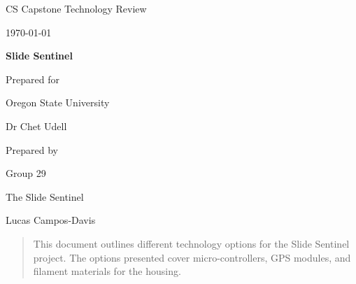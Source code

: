 \documentclass[onecolumn, draftclsnofoot,10pt, compsoc]{IEEEtran}
\def \CapstoneTeamName{		        The Slide Sentinel}
\def \CapstoneTeamNumber{		    29}
\def \GroupMemberTwo{			    Lucas Campos-Davis}
\def \CapstoneProjectName{		    Slide Sentinel}
\def \CapstoneSponsorCompany{	    Oregon State University}
\def \CapstoneSponsorPerson{		Dr Chet Udell}
\def \DocType{	%
				Technology Review
				}
\newcommand{\NameSigPair}[1]{\par
\makebox[2.75in][r]{#1} \hfil 	\makebox[3.25in]{\makebox[2.25in]{\hrulefill} \hfill		\makebox[.75in]{\hrulefill}}
\par\vspace{-12pt} \textit{\tiny\noindent
\makebox[2.75in]{} \hfil		\makebox[3.25in]{\makebox[2.25in][r]{Signature} \hfill	\makebox[.75in][r]{Date}}}}
\renewcommand{\NameSigPair}[1]{#1}
\begin{document}

\begin{titlepage}
    \begin{singlespace}
        \hfill 
        \par\vspace{.2in}
        \centering
        \scshape{
            \huge CS Capstone \DocType \par
            {\large\today}\par
            \vspace{.5in}
            \textbf{\Huge\CapstoneProjectName}\par
            \vfill
            {\large Prepared for}\par
            \Huge \CapstoneSponsorCompany\par
            \vspace{5pt}
            {\Large\NameSigPair{\CapstoneSponsorPerson}\par}
            {\large Prepared by }\par
            Group\CapstoneTeamNumber\par
            \CapstoneTeamName\par 
            \vspace{5pt}
            {\Large
                \NameSigPair{\GroupMemberTwo}\par
            }
            \vspace{20pt}
        }
        \begin{abstract}
        	This document outlines different technology options for the Slide Sentinel project. The options presented cover micro-controllers, GPS modules, and filament materials for the housing.
        \end{abstract}     
    \end{singlespace}
\end{titlepage}



\newpage
{}
\tableofcontents
\clearpage
\end{document}
